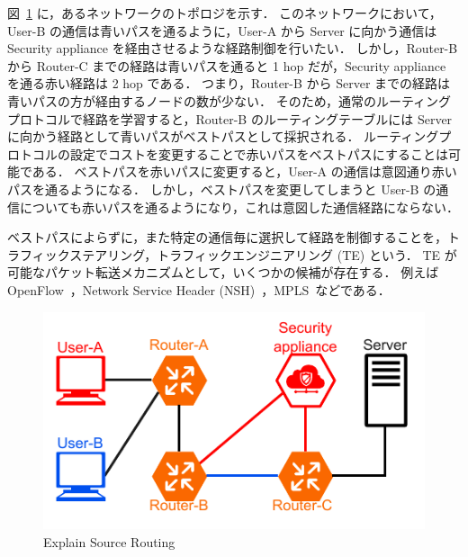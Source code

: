 図~\ref*{fig:exp-src-rtng} に，あるネットワークのトポロジを示す．
このネットワークにおいて，User-B の通信は青いパスを通るように，User-A から Server に向かう通信は Security appliance を経由させるような経路制御を行いたい．
しかし，Router-B から Router-C までの経路は青いパスを通ると 1 hop だが，Security appliance を通る赤い経路は 2 hop である．
つまり，Router-B から Server までの経路は青いパスの方が経由するノードの数が少ない．
そのため，通常のルーティングプロトコルで経路を学習すると，Router-B のルーティングテーブルには Server に向かう経路として青いパスがベストパスとして採択される．
ルーティングプロトコルの設定でコストを変更することで赤いパスをベストパスにすることは可能である．
ベストパスを赤いパスに変更すると，User-A の通信は意図通り赤いパスを通るようになる．
しかし，ベストパスを変更してしまうと User-B の通信についても赤いパスを通るようになり，これは意図した通信経路にならない．

ベストパスによらずに，また特定の通信毎に選択して経路を制御することを，トラフィックステアリング，トラフィックエンジニアリング (TE) という．
TE が可能なパケット転送メカニズムとして，いくつかの候補が存在する．
例えば OpenFlow~\cite{openflow}，Network Service Header (NSH)~\cite{rfc8300}，MPLS~\cite{rfc3031}などである．

\begin{figure}[t]
    \centering
    \includegraphics[width=0.95\linewidth]{img/ExplainSrcRtng.pdf}
    \caption{Explain Source Routing}
    \label{fig:exp-src-rtng}
\end{figure}

